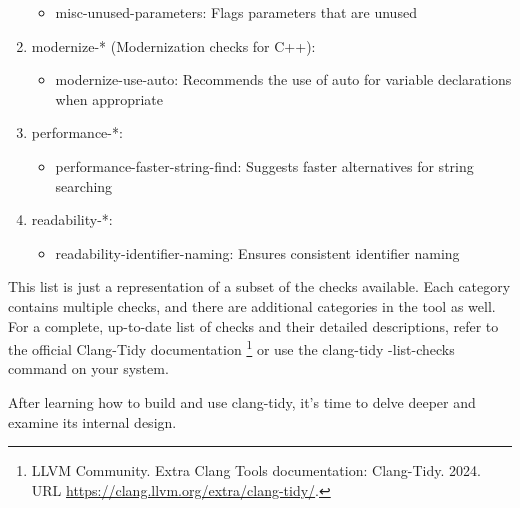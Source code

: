 \begin{enumerate}
\begin{itemize}
\item
misc-unused-parameters: Flags parameters that are unused
\end{itemize}

\item
modernize-* (Modernization checks for C++):

\begin{itemize}
\item
modernize-use-auto: Recommends the use of auto for variable declarations when appropriate
\end{itemize}

\item
performance-*:

\begin{itemize}
\item
performance-faster-string-find: Suggests faster alternatives for string searching
\end{itemize}

\item
readability-*:

\begin{itemize}
\item
readability-identifier-naming: Ensures consistent identifier naming
\end{itemize}
\end{enumerate}

This list is just a representation of a subset of the checks available. Each category contains multiple checks, and there are additional categories in the tool as well. For a complete, up-to-date list of checks and their detailed descriptions, refer to the official Clang-Tidy documentation \footnote{LLVM Community. Extra Clang Tools documentation: Clang-Tidy. 2024. URL \url{https://clang.llvm.org/extra/clang-tidy/}.} or use the clang-tidy -list-checks command on your system.

After learning how to build and use clang-tidy, it's time to delve deeper and examine its internal design.























